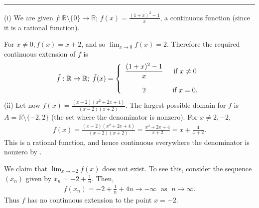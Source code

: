 \documentclass[letterpaper,10pt,english]{jupyterBook}
\begin{document}
\bigskip\hrule\bigskip

\label{\detokenize{Solutions-upto46:id6}}
\sphinxAtStartPar
{\hyperref[\detokenize{Problems:id18}]{}} 

\sphinxAtStartPar
(i) We are given \(f:\mathbb{R} \setminus \{0\} \rightarrow \mathbb{R}\); \(f(x) = \frac{(1 + x)^{2} - 1}{x}\), a continuous function (since it is a rational function).

\sphinxAtStartPar
For \(x \neq 0, f(x) = x+2\), and so \(\lim_{x \rightarrow 0}f(x) = 2\). Therefore the required continuous extension of \(f\) is
\begin{equation*}
\begin{split}
\tilde{f}:\mathbb{R}\to\mathbb{R}; \; \tilde{f}(x) = \left\{\begin{array}{c c} \displaystyle\frac{(1 + x)^{2} - 1}{x} & ~\mbox{if}~x \neq 0\\ 
& \\
2 & ~\mbox{if}~x = 0. \end{array} \right.
\end{split}
\end{equation*}
\sphinxAtStartPar
(ii) Let now \(f(x) = \frac{(x-2)(x^{2} + 2x + 4)}{(x-2)(x+2)}\). The largest possible domain for \(f\) is \(A=\mathbb{R} \setminus \{-2, 2\}\) (the set where the denominator is non\sphinxhyphen{}zero). For \(x \neq 2, -2\),
\begin{equation*}
\begin{split}
f(x) = \frac{(x-2)(x^{2} + 2x + 4)}{(x-2)(x+2)}=\frac{x^{2} + 2x + 4}{x + 2}=x+\frac{4}{x+2}.
\end{split}
\end{equation*}
\sphinxAtStartPar
This is a rational function, and hence continuous everywhere the denominator is non\sphinxhyphen{}zero by .

\sphinxAtStartPar
We claim that \(\lim_{x \rightarrow -2}f(x)\) does not exist. To see this, consider the sequence \((x_{n})\) given by \(x_n=-2 + \frac{1}{n}\). Then,
\begin{equation*}
\begin{split}
f(x_{n}) = -2 + \frac{1}{n}+4n \rightarrow -\infty \; \text{ as } \; n \rightarrow \infty.
\end{split}
\end{equation*}
\sphinxAtStartPar
Thus \(f\) has no continuous extension to the point \(x =-2\).
\end{document}
